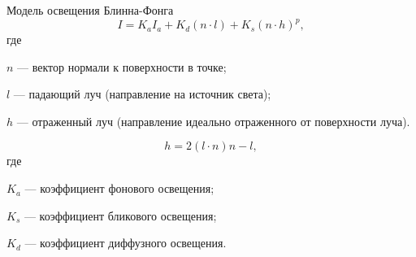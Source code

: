 \documentclass{beamer}
\begin{document}
	\begin{frame}{Модель освещения Блинна-Фонга}
		\[
			I = K_a I_a + K_d (n \cdot l) + K_s (n \cdot h)^p
		,
		\]
		где

		$n$ --- вектор нормали к поверхности в точке;

		$l$ --- падающий луч (направление на источник света);

		$h$ --- отраженный луч (направление идеально отраженного от поверхности луча).

		\[
			h=2(l \cdot n)n-l
		,
		\]
		где

		$K_a$ --- коэффициент фонового освещения;

		$K_s$ --- коэффициент бликового освещения;

		$K_d$ --- коэффициент диффузного освещения.


	\end{frame}

\end{document}
